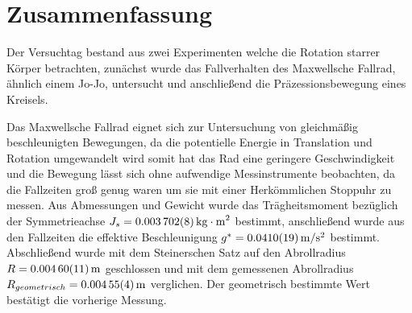 
\section{Zusammenfassung}

Der Versuchtag bestand aus zwei Experimenten welche die Rotation starrer Körper betrachten, zunächst wurde das Fallverhalten des Maxwellsche Fallrad, ähnlich einem Jo-Jo, untersucht und anschließend die Präzessionsbewegung eines Kreisels. 





Das Maxwellsche Fallrad eignet sich zur Untersuchung von gleichmäßig beschleunigten Bewegungen, da die potentielle Energie in Translation und Rotation umgewandelt wird somit hat das Rad eine geringere Geschwindigkeit und die Bewegung lässt sich ohne aufwendige Messinstrumente beobachten, da die Fallzeiten groß genug waren um sie mit einer Herkömmlichen Stoppuhr zu messen.
Aus Abmessungen und Gewicht wurde das Trägheitsmoment bezüglich der Symmetrieachse $J_s=\SI{0.003702 \pm 0.000008}{kg\cdot m^2}$ bestimmt, anschließend wurde aus den Fallzeiten die effektive Beschleunigung  $g^*=\SI{0.0410 \pm  0.0019}{m \per s \squared}$ bestimmt. Abschließend wurde mit dem Steinerschen Satz auf den Abrollradius $R=\SI{0.00460\pm 0.00011}{m}$ geschlossen und mit dem gemessenen Abrollradius $R_{geometrisch}=\SI{0.00455 \pm 0.00004}{m}$ verglichen. Der geometrisch bestimmte Wert bestätigt die vorherige Messung. 






 













